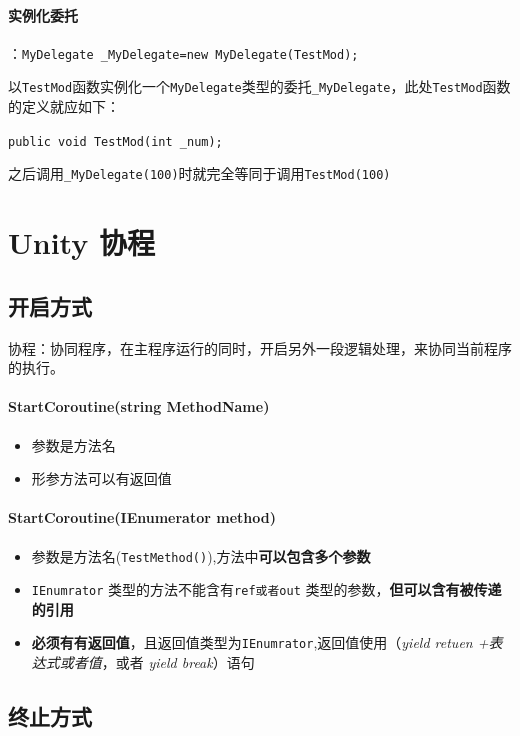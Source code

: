 \documentclass[UTF8,a4paper,12pt]{ctexbook}
\begin{document}
		\paragraph{实例化委托}：\verb|MyDelegate _MyDelegate=new MyDelegate(TestMod);|
			
			以\verb|TestMod|函数实例化一个\verb|MyDelegate|类型的委托\verb|_MyDelegate|，此处\verb|TestMod|函数的定义就应如下：
				
			\verb|public void TestMod(int _num);|
				
			之后调用\verb|_MyDelegate(100)|时就完全等同于调用\verb|TestMod(100)|
		
		
		
	\section{Unity 协程}
		\subsection{开启方式}
			协程：协同程序，在主程序运行的同时，开启另外一段逻辑处理，来协同当前程序的执行。
			
			\paragraph{StartCoroutine(string MethodName)}
				\begin{itemize}
					\item 参数是方法名					
					\item 形参方法可以有返回值
				\end{itemize}
			
			\paragraph{StartCoroutine(IEnumerator method)}
				\begin{itemize}
					\item 参数是方法名(\verb|TestMethod()|),方法中\textbf{可以包含多个参数}
					\item \verb|IEnumrator| 类型的方法不能含有\verb|ref或者out| 类型的参数，\textbf{但可以含有被传递的引用}
					\item \textbf{必须有有返回值}，且返回值类型为\verb|IEnumrator|,返回值使用（\textit{yield retuen +表达式或者值}，或者 \textit{yield break}）语句	
			\end{itemize}
		
		\subsection{终止方式}
\end{document}
